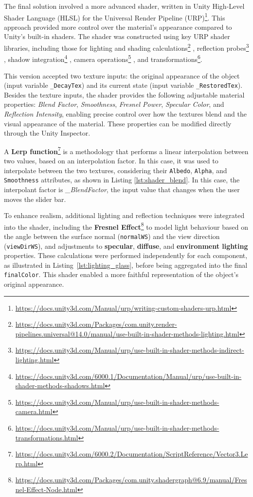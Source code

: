The final solution involved a more advanced shader, written in Unity High-Level Shader Language (HLSL) for the Universal Render Pipeline (URP)\footnote{\url{https://docs.unity3d.com/Manual/urp/writing-custom-shaders-urp.html}}. 
This approach provided more control over the material's appearance compared to Unity's built-in shaders.
The shader was constructed using key URP shader libraries, including those for lighting and shading calculations\footnote{\url{https://docs.unity3d.com/Packages/com.unity.render-pipelines.universal@14.0/manual/use-built-in-shader-methods-lighting.html}}
, reflection probes\footnote{\url{https://docs.unity3d.com/Manual/urp/use-built-in-shader-methods-indirect-lighting.html}}
, shadow integration\footnote{\url{https://docs.unity3d.com/6000.1/Documentation/Manual/urp/use-built-in-shader-methods-shadows.html}}
, camera operations\footnote{\url{https://docs.unity3d.com/Manual/urp/use-built-in-shader-methods-camera.html}}
, and transformations\footnote{\url{https://docs.unity3d.com/Manual/urp/use-built-in-shader-methods-transformations.html}}.

This version accepted two texture inputs: the original appearance of the object (input variable \texttt{\_DecayTex}) and its current state (input variable \texttt{\_RestoredTex}).
Besides the texture inputs, the shader provides the following adjustable material properties: \emph{Blend Factor}, \emph{Smoothness}, \emph{Fresnel Power}, \emph{Specular Color}, and \emph{Reflection Intensity}, enabling precise control over how the textures blend and the visual appearance of the material. 
These properties can be modified directly through the Unity Inspector.

A \textbf{Lerp function}\footnote{\url{https://docs.unity3d.com/6000.2/Documentation/ScriptReference/Vector3.Lerp.html}} is a methodology that performs a linear interpolation between two values, based on an interpolation factor.
In this case, it was used to interpolate between the two textures, considering their \texttt{Albedo}, \texttt{Alpha}, and \texttt{Smoothness} attributes, as shown in Listing \ref{lst:shader_blend}. 
In this case, the interpolant factor is \emph{\_BlendFactor}, the input value that changes when the user moves the slider bar.

To enhance realism, additional lighting and reflection techniques were integrated into the shader, including 
the \textbf{Fresnel Effect}\footnote{\url{https://docs.unity3d.com/Packages/com.unity.shadergraph@6.9/manual/Fresnel-Effect-Node.html}} to model light behaviour based on the angle between the surface normal (\texttt{normalWS}) and the view direction (\texttt{viewDirWS}), 
and adjustments to \textbf{specular}, \textbf{diffuse}, and \textbf{environment lighting} properties. 
These calculations were performed independently for each component, as illustrated in Listing~\ref{lst:lighting_glass}, before being aggregated into the final \texttt{finalColor}. 
This shader enabled a more faithful representation of the object's original appearance.

